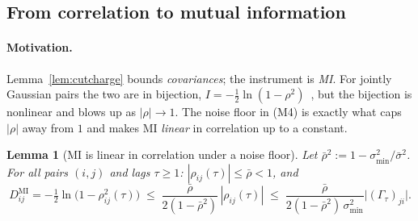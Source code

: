 \documentclass[11pt]{article}
\newtheorem{lemma}[theorem]{Lemma}
\theoremstyle{definition}
\theoremstyle{remark}
\begin{document}
\subsection{From correlation to mutual information}
\label{sec:mi}

\paragraph{Motivation.}
Lemma~\ref{lem:cutcharge} bounds \emph{covariances}; the instrument is
\emph{MI}.
For jointly Gaussian pairs the two are in bijection,
$I = -\tfrac12 \ln(1 - \rho^2)$~\citep[Ch.~8]{cover2006elements}, but the
bijection is nonlinear and blows up as $|\rho| \to 1$.
The noise floor in (M4) is exactly what caps $|\rho|$ away from $1$ and makes
MI \emph{linear} in correlation up to a constant.

\begin{lemma}[MI is linear in correlation under a noise floor]
    \label{lem:gaussmi}
    Let $\bar{\rho}^2 := 1 - \sigma_{\min}^2 / \bar{\sigma}^2$.
    For all pairs $(i,j)$ and lags $\tau \geq 1$:
    $|\rho_{ij}(\tau)| \leq \bar{\rho} < 1$, and
    \begin{equation}
        D^{\mathrm{MI}}_{ij}
        = -\tfrac{1}{2}\ln\!\big(1 - \rho_{ij}^2(\tau)\big)
        \;\leq\;
        \frac{\bar{\rho}}{2(1 - \bar{\rho}^2)}\, |\rho_{ij}(\tau)|
        \;\leq\;
        \frac{\bar{\rho}}{2(1 - \bar{\rho}^2)\, \sigma_{\min}^2}
        \big|(\Gamma_\tau)_{ji}\big|.
        \label{eq:milinear}
    \end{equation}
\end{lemma}
\end{document}
